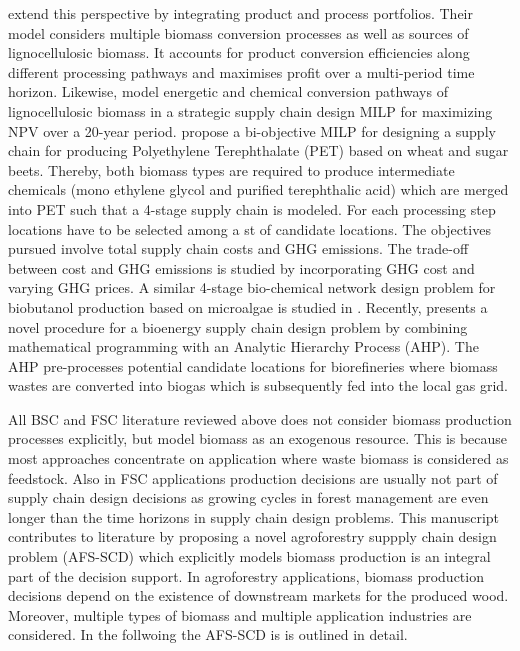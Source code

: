 \documentclass[APA,TimesLARGE]{WileyNJDv5} %
\renewcommand{\problem}{AFS-SCD}
\newcommand{\problemm}{AFS-SCD }
\begin{document}
\cite{Mansoornejad2013_Forest_Biorefinery_SC} extend this perspective by integrating product and process portfolios. Their model considers multiple biomass conversion processes as well as sources of lignocellulosic biomass. It accounts for product conversion efficiencies along different processing pathways and maximises profit over a multi-period time horizon. Likewise, \cite{cambero2015strategic} model energetic and chemical conversion pathways of lignocellulosic biomass in a strategic supply chain design MILP for maximizing NPV over a 20-year period. \cite{GarciaVelasquez2022} propose a bi-objective MILP for designing a supply chain for producing Polyethylene Terephthalate (PET) based on wheat and sugar beets. Thereby, both biomass types are required to produce intermediate chemicals (mono ethylene glycol and purified terephthalic acid) which are merged into PET such that a 4-stage supply chain is modeled. For each processing step locations have to be selected among a st of candidate locations. The objectives pursued involve total supply chain costs and GHG emissions. The trade-off between cost and GHG emissions is studied by incorporating GHG cost and varying GHG prices. A similar 4-stage bio-chemical network design problem for biobutanol production based on microalgae is studied in \cite{Arabi2019_Microalgae_Biobutanol_SC}. Recently, \cite{Roudneshin2025} presents a novel procedure for a bioenergy supply chain design problem by combining mathematical programming with an Analytic Hierarchy Process (AHP). The AHP pre-processes potential candidate locations for biorefineries where biomass wastes are converted into biogas which is subsequently fed into the local gas grid.

All BSC and FSC literature reviewed above does not consider biomass production processes explicitly, but model biomass as an exogenous resource. This is because most approaches concentrate on application where waste biomass is considered as feedstock. Also in FSC applications production decisions are usually not part of supply chain design decisions as growing cycles in forest management are even longer than the time horizons in supply chain design problems. This manuscript contributes to literature by proposing a novel agroforestry suppply chain design problem (\problem) which explicitly models biomass production is an integral part of the decision support. In agroforestry applications, biomass production decisions depend on the existence of downstream markets for the produced wood. Moreover, multiple types of biomass and multiple application industries are considered. In the follwoing the \problemm is is outlined in detail.
\end{document}
